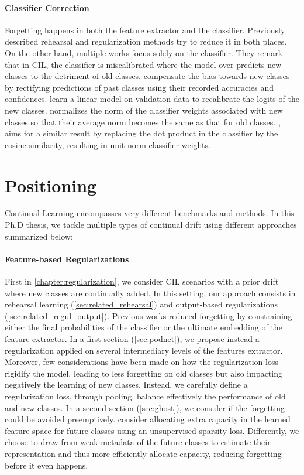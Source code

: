 \paragraph{Classifier Correction} Forgetting happens in both the feature extractor and the
classifier. Previously described rehearsal and regularization methods try to reduce it in both
places. On the other hand, multiple works focus solely on the classifier. They remark that in
\acf{CIL}, the classifier is miscalibrated \citep{guo2017miscalibration} where the model
over-predicts new classes to the detriment of old classes. \cite{belouadah2019il2m} compensate the
bias towards new classes by rectifying predictions of past classes using their recorded accuracies
and confidences. \cite{wu2019bias_correction} learn a linear model on validation data to recalibrate
the logits of the new classes. \cite{zhao2020weightalignement} normalizes the norm of the classifier
weights associated with new classes so that their average norm becomes the same as that for old
classes. \cite{hou2019ucir}, aims for a similar result by replacing the dot product in the
classifier by the cosine similarity, resulting in unit norm classifier weights.

\section{Positioning}

Continual Learning encompasses very different benchmarks and methods. In this Ph.D thesis, we tackle
multiple types of continual drift using different approaches summarized below:

\paragraph{Feature-based Regularizations} First in \autoref{chapter:regularization}, we consider
\acf{CIL} scenarios with a prior drift where new classes are continually added. In this setting, our
approach consists in rehearsal learning (\autoref{sec:related_rehearsal}) and output-based
regularizations (\autoref{sec:related_regul_output}). Previous works reduced forgetting by
constraining either the final probabilities of the classifier or the ultimate embedding of the
feature extractor. In a first section (\autoref{sec:podnet}), we propose instead a regularization
applied on several intermediary levels of the features extractor. Moreover, few considerations have
been made on how the regularization loss rigidify the model, leading to less forgetting on old
classes but also impacting negatively the learning of new classes. Instead, we carefully define a
regularization loss, through pooling, balance effectively the performance of old and new classes.
In a second section (\autoref{sec:ghost}), we consider if the forgetting could be avoided preemptively.
\cite{aljundi2019selfless} consider allocating extra capacity in the learned feature space for
future classes using an unsupervised sparsity loss. Differently, we choose to draw from weak metadata
of the future classes to estimate their representation and thus more efficiently allocate capacity,
reducing forgetting before it even happens.

